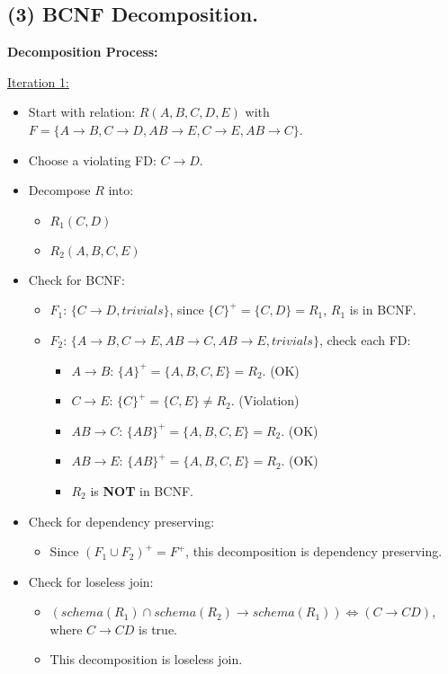 \documentclass{article}[a4paper,11pt]
\begin{document}
\subsection*{(3) BCNF Decomposition.}

\textbf{Decomposition Process:}

\underline{Iteration 1:}
\begin{itemize}
    \item Start with relation: $R(A,B,C,D,E)$ with $F = \{ A \rightarrow B, C \rightarrow D, AB \rightarrow E, C \rightarrow E, AB \rightarrow C \}$.
    \item Choose a violating FD: $C \rightarrow D$.
    \item Decompose $R$ into:
    \begin{itemize}
        \item $R_1(C,D)$
        \item $R_2(A,B,C,E)$
    \end{itemize}
    \item Check for BCNF:
    \begin{itemize}
        \item $F_1$: $\{ C \rightarrow D, trivials\}$, since $\{C\}^+ = \{C,D\} = R_1$, $R_1$ is in BCNF.
        \item $F_2$: $\{ A \rightarrow B, C \rightarrow E, AB \rightarrow C, AB \rightarrow E, trivials\}$, check each FD:
        \begin{itemize}
            \item $A \rightarrow B$: $\{ A \}^+ = \{ A, B, C, E \} = R_2$. (OK)
            \item $C \rightarrow E$: $\{ C \}^+ = \{ C, E \} \neq R_2$. (Violation)
            \item $AB \rightarrow C$: $\{ AB \}^+ = \{ A, B, C, E \} = R_2$. (OK)
            \item $AB \rightarrow E$: $\{ AB \}^+ = \{ A, B, C, E \} = R_2$. (OK)
            \item $R_2$ is \textbf{NOT} in BCNF.
        \end{itemize}
    \end{itemize}
    \item Check for dependency preserving:
    \begin{itemize}
        \item Since $(F_1 \cup F_2)^+ = F^+$, this decomposition is dependency preserving.
    \end{itemize}
    \item Check for loseless join:
    \begin{itemize}
        \item $(schema (R_1) \cap schema(R_2) \rightarrow schema(R_1)) \Leftrightarrow (C \rightarrow CD)$, where $C \rightarrow CD$ is true.
        \item This decomposition is loseless join.
    \end{itemize}
\end{itemize}
\end{document}
